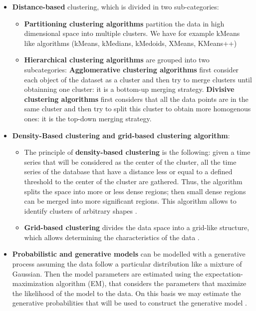 \begin{itemize}
\item   \textbf{Distance-based} clustering, which is divided in two sub-categories:
	\begin{itemize}
	\item \textbf{Partitioning clustering algorithms}  partition the data in        	high dimensional space into multiple clusters. We have for example kMeans like 		algorithms (kMeans, kMedians, kMedoids, XMeans, KMeans++)
	\item \textbf{Hierarchical clustering algorithms} are grouped into two 				subcategories: \textbf{Agglomerative clustering algorithms} first consider each 		object of the dataset as a cluster and then try to merge clusters until  obtainning 		one cluster: it is a bottom-up merging strategy. \textbf{Divisive clustering 			algorithms} first considers that all the data points are in the same cluster 		and then try to split this cluster to obtain more homogenous ones: it is the top-down merging strategy.
	\end{itemize}
   
\item \textbf{Density-Based clustering and grid-based clustering algorithm}:
 
\begin{itemize}
	\item The principle of \textbf{density-based clustering} is the following:   given a time 		series that will be considered as the center of the cluster,  all the time series of the database that have a distance less or 		equal to a defined threshold to the center of the cluster are gathered. Thus, the 			algorithm splits the space into more or less dense regions; then small dense  			regions can be merged into more significant regions. This algorithm allows to identify  		clusters of arbitrary shapes  \cite{kriegel2011density}.
	\item \textbf{Grid-based clustering} divides the data space into a grid-like 				structure, which allows determining the characteristics of the data \cite{amini2011study}.
\end{itemize}


\item \textbf{Probabilistic and generative models} can be modelled  with a generative process assuming the data follow a particular distribution like a mixture of Gaussian. Then the model parameters are estimated using the expectation-maximization algorithm (EM), that considers the parameters that maximize the likelihood of the model to the data. On this basis we may estimate the generative probabilities that will be used to construct the generative model \cite{merugu2003privacy}.



\end{itemize}
